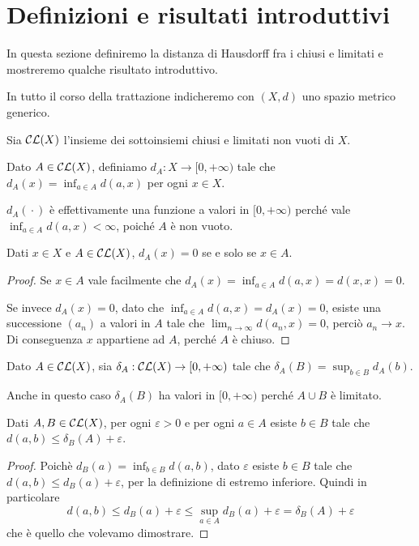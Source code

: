 \section{Definizioni e risultati introduttivi}
In questa sezione definiremo la distanza di Hausdorff fra i chiusi e limitati e mostreremo qualche risultato introduttivo.

In tutto il corso della trattazione indicheremo con $(X,d)$ uno spazio metrico generico.

\begin{definition}
	Sia $\mathcal{CL}(X)$ l'insieme dei sottoinsiemi chiusi e limitati non vuoti di $X$.
\end{definition}

\begin{definition}
	Dato $A\in \mathcal{CL}(X)$, definiamo $d_A: X\to [0,+\infty)$ tale che $d_A(x)=\inf_{a\in A}d(a,x)$ per ogni $x\in X$.
\end{definition}

\begin{remark}
	$d_A({}\cdot{})$ è effettivamente una funzione a valori in $[0,+\infty)$ perché vale $\inf_{a\in A}d(a,x)<\infty$, poiché $A$ è non vuoto.
\end{remark}

\begin{lemma}\label{DistanzaChiusoAppartenenza}
	Dati $x\in X$ e $A \in \mathcal{CL}(X)$, $d_A(x)=0$ se e solo se $x\in A$.
\end{lemma}
\begin{proof}
	Se $x\in A$ vale facilmente che $d_A(x)=\inf_{a\in A}d(a,x)=d(x,x)=0$. 

	Se invece $d_A(x)=0$, dato che $\inf_{a\in A}d(a,x)=d_A(x)=0$, esiste una successione $(a_n)$ a valori in $A$ tale che $\lim_{n\to\infty}d(a_n,x)=0$, perciò $a_n\to x$. Di conseguenza $x$ appartiene ad $A$, perché $A$ è chiuso. 
\end{proof}


\begin{definition}\label{DistanzaAsimmetrica}
	Dato $A\in\mathcal{CL}(X)$, sia $\delta_A:\mathcal{CL}(X)\to [0,+\infty)$ tale che $\delta_A(B)=\sup_{b\in B} d_A(b)$.
\end{definition}
\begin{remark}
	Anche in questo caso $\delta_A(B)$ ha valori in $[0,+\infty)$ perché $A\cup B$ è limitato.
\end{remark}

\begin{lemma}\label{ApprossimazioneDistanzaAsimmetrica}
	Dati $A,B\in \mathcal{CL}(X)$, per ogni $\varepsilon>0$ e per ogni $a\in A$ esiste $b\in B$ tale che $d(a,b)\le \delta_B(A)+\varepsilon$.
\end{lemma}
\begin{proof}
	Poichè $d_B(a)=\inf_{b\in B}d(a,b)$, dato $\varepsilon$ esiste $b\in B$ tale che $d(a,b)\le d_B(a)+\varepsilon$, per la definizione di estremo inferiore. Quindi in particolare
	\begin{equation*}
		d(a,b)\le d_B(a)+\varepsilon\le \sup_{a\in A}d_B(a)+\varepsilon=\delta_B(A)+\varepsilon
	\end{equation*}
	che è quello che volevamo dimostrare.
\end{proof}


